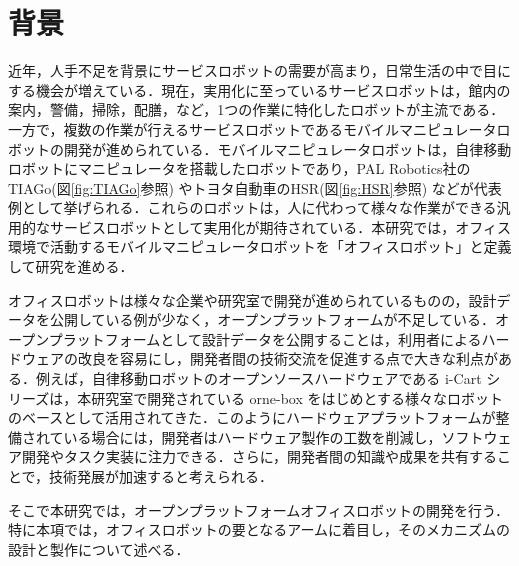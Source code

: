 
\section{背景}
近年，人手不足を背景にサービスロボットの需要が高まり，日常生活の中で目にする機会が増えている．現在，実用化に至っているサービスロボットは，館内の案内\cite{AYUDA:online}，警備\cite{SQ-2:online}，掃除\cite{Pana:online}，配膳\cite{BellaBot:online}，など，1つの作業に特化したロボットが主流である．一方で，複数の作業が行えるサービスロボットであるモバイルマニピュレータロボットの開発が進められている．モバイルマニピュレータロボットは，自律移動ロボットにマニピュレータを搭載したロボットであり，PAL Robotics社のTIAGo(図\ref{fig:TIAGo}参照) やトヨタ自動車のHSR(図\ref{fig:HSR}参照) などが代表例として挙げられる．これらのロボットは，人に代わって様々な作業ができる汎用的なサービスロボットとして実用化が期待されている\cite{古賀達也201937_707}．本研究では，オフィス環境で活動するモバイルマニピュレータロボットを「オフィスロボット」と定義して研究を進める．

オフィスロボットは様々な企業や研究室で開発が進められているものの，設計データを公開している例が少なく，オープンプラットフォームが不足している．オープンプラットフォームとして設計データを公開することは，利用者によるハードウェアの改良を容易にし，開発者間の技術交流を促進する点で大きな利点がある．例えば，自律移動ロボットのオープンソースハードウェアである i-Cart シリーズは，本研究室で開発されている orne-box をはじめとする様々なロボットのベースとして活用されてきた．このようにハードウェアプラットフォームが整備されている場合には，開発者はハードウェア製作の工数を削減し，ソフトウェア開発やタスク実装に注力できる．さらに，開発者間の知識や成果を共有することで，技術発展が加速すると考えられる．

そこで本研究では，オープンプラットフォームオフィスロボットの開発を行う．特に本項では，オフィスロボットの要となるアームに着目し，そのメカニズムの設計と製作について述べる．


